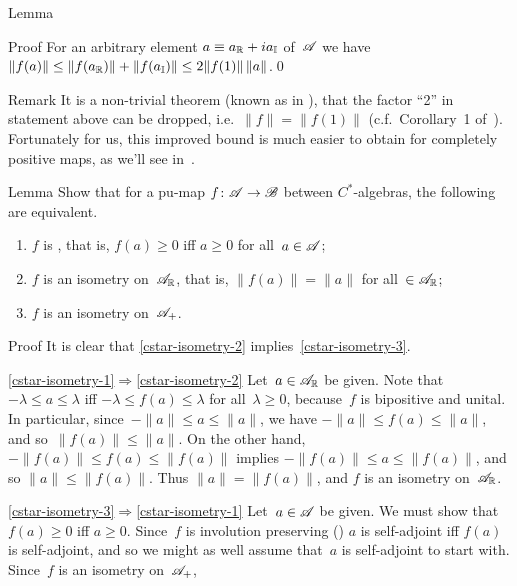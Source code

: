 \documentclass[a]{subfiles}
\begin{document}
\begin{parsec}
\begin{point}{Lemma}
\begin{point}{Proof}
For an arbitrary element $a\equiv a_{\mathbb{R}}+ia_{\mathbb{I}}$
of~$\mathscr{A}$
we have 
$\|f(a)\|\leq \|f(a_{\mathbb{R}})\|+\|f(a_{\mathbb{I}})\|\leq 2\|f(1)\|\,\|a\|$.\qed
\end{point}
\begin{point}{Remark}%
It is a non-trivial theorem (known as 
in \cite{paulsen}),
that the factor ``2'' in statement above
can be dropped, i.e.~$\|f\|=\|f(1)\|$
(c.f.~Corollary~1 of~\cite{russodye}).
Fortunately for us,
this improved bound
is much easier to obtain
for completely positive maps,
as we'll see in~.
\end{point}
\end{point}
\begin{point}{Lemma}%
Show that for a pu-map $f\colon \mathscr{A}\to\mathscr{B}$
between $C^*$-algebras,
the following are equivalent.
\begin{enumerate}
\item\label{cstar-isometry-1}
	$f$ is , that is, $f(a)\geq 0$ iff $a\geq 0$
	for all~$a\in\mathscr{A}$;
\item\label{cstar-isometry-2}
	$f$ is an isometry on~$\mathscr{A}_{\mathbb{R}}$, 
	that is, $\|f(a)\|=\|a\|$ for all~$\in \mathscr{A}_{\mathbb{R}}$;
\item\label{cstar-isometry-3}
	$f$ is an isometry on~$\mathscr{A}_{+}$.
\end{enumerate}
\begin{point}{Proof}%
It is clear that \ref{cstar-isometry-2} implies~\ref{cstar-isometry-3}.
\begin{point}{\ref{cstar-isometry-1}$\Longrightarrow$\ref{cstar-isometry-2}}%
Let~$a\in \mathscr{A}_{\mathbb{R}}$ be given.
Note that $-\lambda \leq a\leq \lambda$
iff $-\lambda \leq f(a) \leq \lambda$
for all~$\lambda \geq 0$,
because~$f$ is bipositive and unital.
In particular,
since~$-\|a\|\leq a\leq \|a\|$,
we have $-\|a\|\leq f(a)\leq \|a\|$,
and so~$\|f(a)\|\leq \|a\|$.
On the other hand,
$-\|f(a)\|\leq f(a)\leq \|f(a)\|$
implies $-\|f(a)\|\leq a\leq \|f(a)\|$,
and so $\|a\|\leq \|f(a)\|$.
Thus $\|a\|=\|f(a)\|$,
and $f$ is an isometry on~$\mathscr{A}_{\mathbb{R}}$.
\end{point}
\begin{point}{\ref{cstar-isometry-3}$\Longrightarrow$\ref{cstar-isometry-1}}%
Let~$a\in \mathscr{A}$ be given.
We must show that~$f(a)\geq 0$ iff $a\geq 0$.
Since~$f$ is involution preserving ()
$a$ is self-adjoint iff $f(a)$ is self-adjoint,
and so we might as well assume that~$a$ is self-adjoint
to start with.
Since~$f$ is an isometry on~$\mathscr{A}_+$,

\end{point}
\end{point}
\end{point}
\end{parsec}
\end{document}
